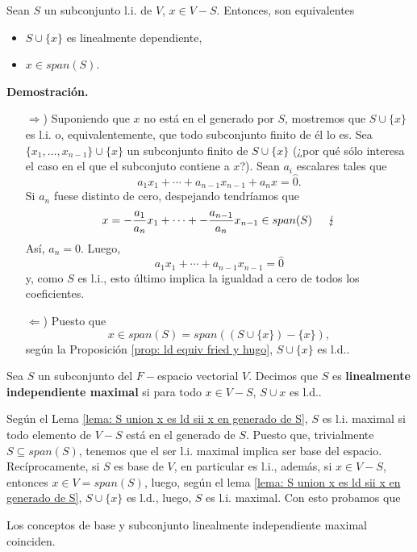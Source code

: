\begin{lema}
	\label{lema: S union x es ld sii x en generado de S}
Sean $S$ un subconjunto l.i. de $V$, $x \in V - S$.
Entonces, 
son equivalentes
\begin{itemize}
	\item $S \cup \{ x \}$ es linealmente dependiente,
	\item $x \in span(S)$.
\end{itemize}
\end{lema}
\noindent
\textbf{Demostración.}
\begin{itemize}
	\item[$\Rightarrow$)] Suponiendo que $x$ no está en el generado por
	$S$, mostremos que $S \cup \{ x \} $ es l.i. o, equivalentemente,
	que todo subconjunto finito de él lo es. Sea 
	$\{ x_{1}, \ldots , x_{n-1} \} \cup \{ x \}$
	un subconjunto finito de $S \cup \{ x \}$ (¿por qué sólo interesa
	el caso en el que el subconjuto contiene a $x$?). Sean 
	$a_{i}$ escalares tales que 
	\[
	a_{1} x_{1} + \cdots + a_{n-1}x_{n-1} + a_{n}x = \hat{0}.
	\]
	Si $a_{n}$ fuese distinto de cero, despejando tendríamos que
	\[
	x = -\frac{a_{1}}{a_{n}}x_{1} + \cdots + -\frac{a_{n-1}}{a_{n}}x_{n-1}
	\in span(S) \hspace{0.5cm} \lightning
	\]
	Así, $a_{n} = 0$. Luego,
	\[
	a_{1} x_{1} + \cdots + a_{n-1}x_{n-1} = \hat{0}
	\]
	y, como $S$ es l.i., esto último implica la igualdad a cero 
	de todos los coeficientes.
	\item[$\Leftarrow$)] Puesto que
	\[
	x \in span(S) = span( (S \cup \{ x \}) - \{ x \}),
	\]
	según la Proposición \ref{prop: ld equiv fried y hugo},
	$S \cup \{ x \}$ es l.d..
\end{itemize}

\QEDB
\vspace{0.2cm}

\begin{defi}
	Sea $S$ un subconjunto del $F-$espacio vectorial $V$. Decimos que
	$S$ es \textbf{linealmente independiente maximal} si
	para todo $x \in V - S$, $S \cup {x}$ es l.d..
\end{defi}
Según el Lema 
\ref{lema: S union x es ld sii x en generado de S}, $S$ es l.i. maximal
si todo elemento de $V-S$ está en el generado de $S$. Puesto que, trivialmente
$S \subseteq span(S)$, tenemos que el ser l.i. maximal implica ser base del 
espacio. Recíprocamente, si $S$ es base de $V$, en particular es l.i., además,
si $x \in V-S$, entonces $x \in V = span(S)$, luego, según el lema
\ref{lema: S union x es ld sii x en generado de S}, 
$S \cup \{x\}$ es l.d., luego, $S$ es l.i. maximal.
Con esto probamos que 
\begin{obs}
	Los conceptos de base y subconjunto linealmente independiente maximal
	coinciden.
\end{obs}

